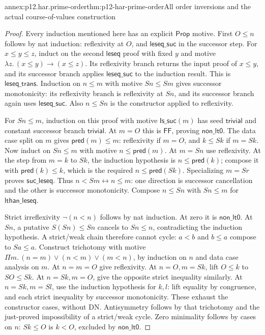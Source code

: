 \begin{annexitem}{annex:p12.har.prime-order}{thm:p12-har-prime-order}{All order inversions and the actual course-of-values construction}
\begin{proof}
Every induction mentioned here has an explicit \(\mathsf{Prop}\)
motive. First \(O\le n\) follows by nat induction: reflexivity at
\(O\), and \(\mathsf{leseq\_suc}\) in the successor step.
For \(x\le y\le z\), induct on the second \(\mathsf{leseq}\) proof
with fixed \(y\) and motive \(\lambda z.\,(x\le y)\to(x\le z)\).
Its reflexivity branch returns the input proof of \(x\le y\), and
its successor branch applies \(\mathsf{leseq\_suc}\) to the induction
result. This is \(\mathsf{leseq\_trans}\).
Induction on \(n\le m\) with motive \(S n\le S m\) gives successor
monotonicity: its reflexivity branch is reflexivity at \(S n\), and
its successor branch again uses \(\mathsf{leseq\_suc}\).
Also \(n\le S n\) is the constructor applied to reflexivity.

For \(S n\le m\), induction on this proof with motive
\(\mathsf{Is\_suc}(m)\) has seed \(\mathsf{trivial}\) and constant
successor branch \(\mathsf{trivial}\). At \(m=O\) this is
\(\mathsf{FF}\), proving \(\mathsf{non\_lt0}\).
The data case split on \(m\) gives \(\mathsf{pred}(m)\le m\):
reflexivity if \(m=O\), and \(k\le S k\) if \(m=S k\).
Now induct on \(S n\le m\) with motive \(n\le\mathsf{pred}(m)\).
At \(m=S n\) use reflexivity. At the step from \(m=k\) to \(S k\),
the induction hypothesis is \(n\le\mathsf{pred}(k)\);
compose it with \(\mathsf{pred}(k)\le k\), which is the required
\(n\le\mathsf{pred}(S k)\). Specializing \(m=S r\) proves
\(\mathsf{suc\_leseq}\). Thus
\(n<S m\leftrightarrow n\le m\): one direction is successor
cancellation and the other is successor monotonicity.
Compose \(n\le S n\) with \(S n\le m\) for
\(\mathsf{lthan\_leseq}\).

Strict irreflexivity \(\neg(n<n)\) follows by nat induction. At
zero it is \(\mathsf{non\_lt0}\). At \(S n\), a putative
\(S(S n)\le S n\) cancels to \(S n\le n\), contradicting the
induction hypothesis. A strict/weak chain therefore cannot cycle:
\(a<b\) and \(b\le a\) compose to \(S a\le a\).
Construct trichotomy with motive
\(\Pi m.\,(n=m)\vee(n<m)\vee(m<n)\), by induction on \(n\)
and data case analysis on \(m\). At \(n=m=O\) give reflexivity.
At \(n=O,m=S k\), lift \(O\le k\) to \(S O\le S k\).
At \(n=S k,m=O\), give the opposite strict inequality similarly.
At \(n=S k,m=S l\), use the induction hypothesis for \(k,l\):
lift equality by congruence, and each strict inequality by successor
monotonicity. These exhaust the constructor cases, without DN.
Antisymmetry follows by that trichotomy and the just-proved impossibility
of a strict/weak cycle. Zero minimality follows by cases on \(n\):
\(S k\le O\) is \(k<O\), excluded by \(\mathsf{non\_lt0}\).


\end{proof}
\end{annexitem}
